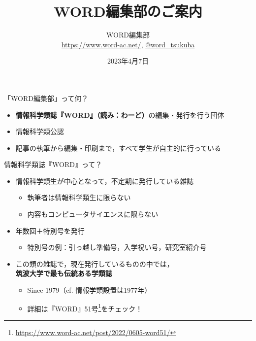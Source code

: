 \documentclass[lualatex]{beamer}
\title{\textbf{WORD編集部のご案内}}
\author{WORD編集部\\\url{https://www.word-ac.net/}, \href{https://twitter.com/word\_tsukuba}{@word\_tsukuba}}
\date{2023年4月7日}   %
\begin{document}
\maketitle

\begin{frame}[plain]{「WORD編集部」って何？}
  \begin{itemize}
  \item \alert{\textbf{情報科学類誌『WORD』（読み：わーど）}}の編集・発行を行う団体
  \item 情報科学類公認
  \item 記事の執筆から編集・印刷まで，すべて学生が自主的に行っている
  \end{itemize}
\end{frame}

\begin{frame}[plain]{情報科学類誌『WORD』って？}
 \begin{itemize}
  \item 情報科学類生が中心となって，不定期に発行している雑誌
  \begin{itemize}
   \item 執筆者は情報科学類生に限らない
   \item 内容もコンピュータサイエンスに限らない
  \end{itemize}
  \item 年数回＋特別号を発行
  \begin{itemize}
   \item 特別号の例：引っ越し準備号，入学祝い号，研究室紹介号
  \end{itemize}
  \item \alert{この類の雑誌で，現在発行しているものの中では，\\\textbf{筑波大学で最も伝統ある学類誌}}
  \begin{itemize}
   \item Since 1979（cf. 情報学類設置は1977年）
   \item 詳細は『WORD』51号\footnote{\url{https://www.word-ac.net/post/2022/0605-word51/}}をチェック！
  \end{itemize}
 \end{itemize}
\end{frame}
\end{document}
